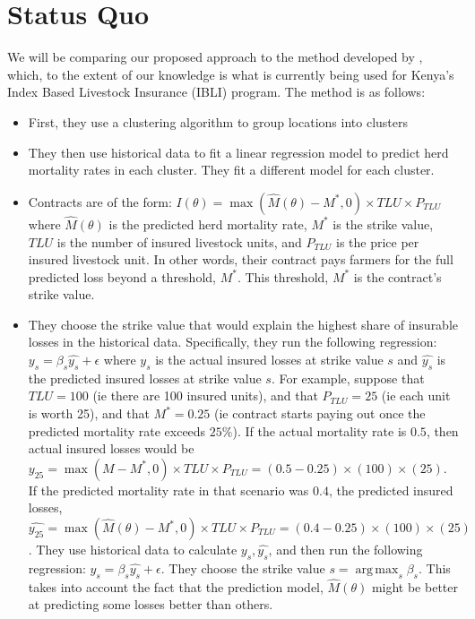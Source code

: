\documentclass[11pt]{article}
\DeclareMathOperator*{\argmax}{arg\,max}
\begin{document}
\section{Status Quo}
We will be comparing our proposed approach to the method developed by \cite{chantarat2013designing}, which, to the extent of our knowledge is what is currently being used for Kenya's Index Based Livestock Insurance (IBLI) program. The method is as follows: 
\begin{itemize}
    \item First, they use a clustering algorithm to group locations into clusters
    \item They then use historical data to fit a linear regression model to predict herd mortality rates in each cluster. They fit a different model for each cluster. 
    \item Contracts are of the form: $I(\theta) = \max(\hat{M}(\theta)-M^*,0)\times TLU \times P_{TLU}$ where $\hat{M}(\theta)$ is the predicted herd mortality rate, $M^*$ is the strike value, $TLU$ is the number of insured livestock units, and $P_{TLU}$ is the price per insured livestock unit.  In other words, their contract pays farmers for the full predicted loss beyond a threshold, $M^*$. This threshold, $M^*$ is the contract's strike value. 
    \item They choose the strike value that would explain the highest share of insurable losses in the historical data. Specifically, they run the following regression: $y_s = \beta_s \hat{y_s}+\epsilon$ where $y_s$ is the actual insured losses at strike value $s$ and $\hat{y_s}$ is the predicted insured losses at strike value $s$. For example, suppose that $TLU=100$ (ie there are 100 insured units), and that $P_{TLU}=25$ (ie each unit is worth 25), and that $M^* = 0.25$ (ie contract starts paying out once the predicted mortality rate exceeds $25\%$). If the actual mortality rate is $0.5$, then actual insured losses would be $y_{25} = \max(M-M^*,0)\times TLU \times P_{TLU} = (0.5-0.25)\times(100) \times (25)$. If the predicted mortality rate in that scenario was $0.4$, the predicted insured losses, $\hat{y_{25}} = \max(\hat{M}(\theta)-M^*,0)\times TLU \times P_{TLU} = (0.4-0.25)\times(100) \times (25)$. They use historical data to calculate $y_s, \hat{y_s}$, and then run the following regression: $y_s = \beta_s \hat{y_s}+\epsilon$. They choose the strike value $s= \argmax_s \beta_s$. This takes into account the fact that the prediction model, $\hat{M}(\theta)$ might be better at predicting some losses better than others. 
\end{itemize}
\end{document}
